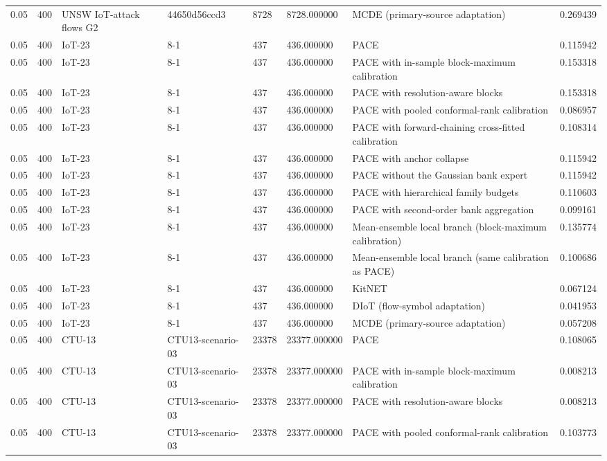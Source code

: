\begin{tabular}{llllllll}
0.05 & 400 & UNSW IoT-attack flows G2 & 44650d56ccd3 & 8728 & 8728.000000 & MCDE (primary-source adaptation) & 0.269439 \\
0.05 & 400 & IoT-23 & 8-1 & 437 & 436.000000 & PACE & 0.115942 \\
0.05 & 400 & IoT-23 & 8-1 & 437 & 436.000000 & PACE with in-sample block-maximum calibration & 0.153318 \\
0.05 & 400 & IoT-23 & 8-1 & 437 & 436.000000 & PACE with resolution-aware blocks & 0.153318 \\
0.05 & 400 & IoT-23 & 8-1 & 437 & 436.000000 & PACE with pooled conformal-rank calibration & 0.086957 \\
0.05 & 400 & IoT-23 & 8-1 & 437 & 436.000000 & PACE with forward-chaining cross-fitted calibration & 0.108314 \\
0.05 & 400 & IoT-23 & 8-1 & 437 & 436.000000 & PACE with anchor collapse & 0.115942 \\
0.05 & 400 & IoT-23 & 8-1 & 437 & 436.000000 & PACE without the Gaussian bank expert & 0.115942 \\
0.05 & 400 & IoT-23 & 8-1 & 437 & 436.000000 & PACE with hierarchical family budgets & 0.110603 \\
0.05 & 400 & IoT-23 & 8-1 & 437 & 436.000000 & PACE with second-order bank aggregation & 0.099161 \\
0.05 & 400 & IoT-23 & 8-1 & 437 & 436.000000 & Mean-ensemble local branch (block-maximum calibration) & 0.135774 \\
0.05 & 400 & IoT-23 & 8-1 & 437 & 436.000000 & Mean-ensemble local branch (same calibration as PACE) & 0.100686 \\
0.05 & 400 & IoT-23 & 8-1 & 437 & 436.000000 & KitNET & 0.067124 \\
0.05 & 400 & IoT-23 & 8-1 & 437 & 436.000000 & DIoT (flow-symbol adaptation) & 0.041953 \\
0.05 & 400 & IoT-23 & 8-1 & 437 & 436.000000 & MCDE (primary-source adaptation) & 0.057208 \\
0.05 & 400 & CTU-13 & CTU13-scenario-03 & 23378 & 23377.000000 & PACE & 0.108065 \\
0.05 & 400 & CTU-13 & CTU13-scenario-03 & 23378 & 23377.000000 & PACE with in-sample block-maximum calibration & 0.008213 \\
0.05 & 400 & CTU-13 & CTU13-scenario-03 & 23378 & 23377.000000 & PACE with resolution-aware blocks & 0.008213 \\
0.05 & 400 & CTU-13 & CTU13-scenario-03 & 23378 & 23377.000000 & PACE with pooled conformal-rank calibration & 0.103773 \\

\end{tabular}
